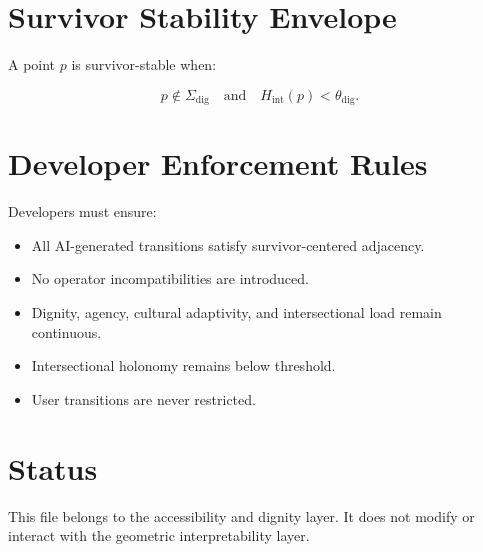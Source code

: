 \documentclass[11pt]{article}
\begin{document}
\section{Survivor Stability Envelope}

A point $p$ is survivor-stable when:

\[
p \notin \Sigma_{\mathrm{dig}}
\quad\text{and}\quad
H_{\mathrm{int}}(p) < \theta_{\mathrm{dig}}.
\]

\section{Developer Enforcement Rules}

Developers must ensure:

\begin{itemize}
  \item All AI-generated transitions satisfy survivor-centered adjacency.
  \item No operator incompatibilities are introduced.
  \item Dignity, agency, cultural adaptivity, and intersectional load remain continuous.
  \item Intersectional holonomy remains below threshold.
  \item User transitions are never restricted.
\end{itemize}

\section{Status}

This file belongs to the accessibility and dignity layer. It does not modify or
interact with the geometric interpretability layer.
\end{document}
